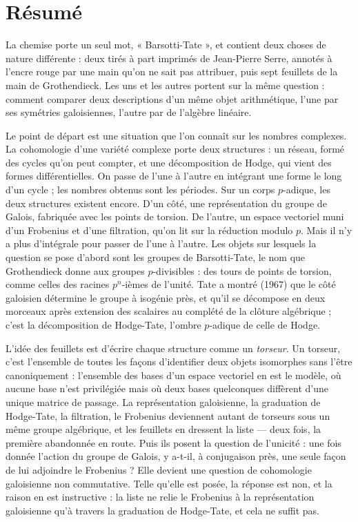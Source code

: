 \documentclass[11pt,a4paper]{article}
\begin{document}
\section*{Résumé}

\begin{resume}
La chemise porte un seul mot, « Barsotti-Tate », et contient deux choses de
nature différente : deux tirés à part imprimés de Jean-Pierre Serre, annotés à
l'encre rouge par une main qu'on ne sait pas attribuer, puis sept feuillets de
la main de Grothendieck. Les uns et les autres portent sur la même question :
comment comparer deux descriptions d'un même objet arithmétique, l'une par ses
symétries galoisiennes, l'autre par de l'algèbre linéaire.

Le point de départ est une situation que l'on connaît sur les nombres
complexes. La cohomologie d'une variété complexe porte deux structures : un
réseau, formé des cycles qu'on peut compter, et une décomposition de Hodge,
qui vient des formes différentielles. On passe de l'une à l'autre en intégrant
une forme le long d'un cycle ; les nombres obtenus sont les périodes. Sur un
corps $p$-adique, les deux structures existent encore. D'un côté, une
représentation du groupe de Galois, fabriquée avec les points de torsion. De
l'autre, un espace vectoriel muni d'un Frobenius et d'une filtration, qu'on lit
sur la réduction modulo $p$. Mais il n'y a plus d'intégrale pour passer de
l'une à l'autre. Les objets sur lesquels la question se pose d'abord sont les
groupes de Barsotti-Tate, le nom que Grothendieck donne aux groupes
$p$-divisibles : des tours de points de torsion, comme celles des racines
$p^n$-ièmes de l'unité. Tate a montré (1967) que le côté galoisien détermine
le groupe à isogénie près, et qu'il se décompose en deux morceaux après
extension des scalaires au complété de la clôture algébrique ; c'est la
décomposition de Hodge-Tate, l'ombre $p$-adique de celle de Hodge.

L'idée des feuillets est d'écrire chaque structure comme un \emph{torseur}.
Un torseur, c'est l'ensemble de toutes les façons d'identifier deux objets
isomorphes sans l'être canoniquement : l'ensemble des bases d'un espace
vectoriel en est le modèle, où aucune base n'est privilégiée mais où deux
bases quelconques diffèrent d'une unique matrice de passage. La
représentation galoisienne, la graduation de Hodge-Tate, la filtration, le
Frobenius deviennent autant de torseurs sous un même groupe algébrique, et les
feuillets en dressent la liste --- deux fois, la première abandonnée en
route. Puis ils posent la question de l'unicité : une fois donnée
l'action du groupe de Galois, y a-t-il, à conjugaison près, une seule façon de
lui adjoindre le Frobenius ? Elle devient une question de cohomologie
galoisienne non commutative. Telle qu'elle est posée, la réponse est non, et
la raison en est instructive : la liste ne relie le Frobenius à la
représentation galoisienne qu'à travers la graduation de Hodge-Tate, et cela
ne suffit pas.


\end{resume}
\end{document}
